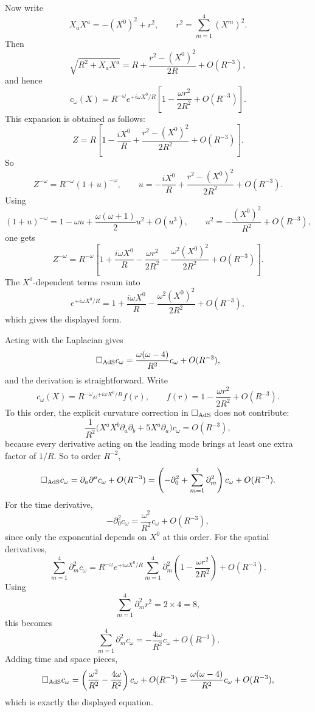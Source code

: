 \documentclass[12pt]{article}
\begin{document}
Now write
\begin{equation}
X_aX^a=-(X^0)^2+r^2,
\qquad
r^2=\sum_{m=1}^4 (X^m)^2.
\end{equation}
Then
\begin{equation}
\sqrt{R^2+X_aX^a}
=
R+\frac{r^2-(X^0)^2}{2R}+O(R^{-3}),
\end{equation}
and hence
\begin{equation}
c_\omega(X)=
R^{-\omega}e^{+i\omega X^0/R}
\left[1-\frac{\omega r^2}{2R^2}+O(R^{-3})\right].
\end{equation}
This expansion is obtained as follows:
\[
Z
=
R\left[
1-\frac{iX^0}{R}+\frac{r^2-(X^0)^2}{2R^2}+O(R^{-3})
\right].
\]
So
\[
Z^{-\omega}
=
R^{-\omega}(1+u)^{-\omega},
\qquad
u=-\frac{iX^0}{R}+\frac{r^2-(X^0)^2}{2R^2}+O(R^{-3}).
\]
Using
\[
(1+u)^{-\omega}=1-\omega u+\frac{\omega(\omega+1)}{2}u^2+O(u^3),
\qquad
u^2=-\frac{(X^0)^2}{R^2}+O(R^{-3}),
\]
one gets
\[
Z^{-\omega}
=
R^{-\omega}\left[
1+\frac{i\omega X^0}{R}
-\frac{\omega r^2}{2R^2}
-\frac{\omega^2(X^0)^2}{2R^2}
+O(R^{-3})
\right].
\]
The $X^0$-dependent terms resum into
\[
e^{+i\omega X^0/R}
=
1+\frac{i\omega X^0}{R}-\frac{\omega^2(X^0)^2}{2R^2}+O(R^{-3}),
\]
which gives the displayed form.

Acting with the Laplacian gives
\begin{equation}
\Box_{\rm AdS}c_\omega
=
\frac{\omega(\omega-4)}{R^2}c_\omega+O(R^{-3}),
\end{equation}
and the derivation is straightforward.  Write
\[
c_\omega(X)=R^{-\omega}e^{+i\omega X^0/R}f(r),
\qquad
f(r)=1-\frac{\omega r^2}{2R^2}+O(R^{-3}).
\]
To this order, the explicit curvature correction in $\Box_{\rm AdS}$ does not contribute:
\[
\frac{1}{R^2}\Big(X^aX^b\partial_a\partial_b+5X^a\partial_a\Big)c_\omega=O(R^{-3}),
\]
because every derivative acting on the leading mode brings at least one extra factor of $1/R$.
So to order $R^{-2}$,
\[
\Box_{\rm AdS}c_\omega=\partial_a\partial^a c_\omega+O(R^{-3})
=
\left(-\partial_0^2+\sum_{m=1}^4\partial_m^2\right)c_\omega+O(R^{-3}).
\]
For the time derivative,
\[
-\partial_0^2 c_\omega
=
\frac{\omega^2}{R^2}c_\omega+O(R^{-3}),
\]
since only the exponential depends on $X^0$ at this order.  For the spatial derivatives,
\[
\sum_{m=1}^4\partial_m^2 c_\omega
=
R^{-\omega}e^{+i\omega X^0/R}\sum_{m=1}^4\partial_m^2
\left(1-\frac{\omega r^2}{2R^2}\right)+O(R^{-3}).
\]
Using
\[
\sum_{m=1}^4\partial_m^2 r^2 = 2\times 4 = 8,
\]
this becomes
\[
\sum_{m=1}^4\partial_m^2 c_\omega
=
-\frac{4\omega}{R^2}c_\omega+O(R^{-3}).
\]
Adding time and space pieces,
\[
\Box_{\rm AdS}c_\omega
=
\left(\frac{\omega^2}{R^2}-\frac{4\omega}{R^2}\right)c_\omega+O(R^{-3})
=
\frac{\omega(\omega-4)}{R^2}c_\omega+O(R^{-3}),
\]
which is exactly the displayed equation.
\end{document}

